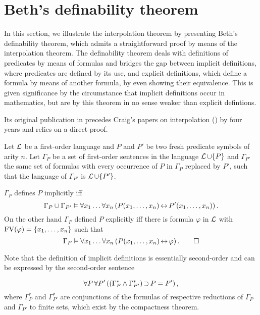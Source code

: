 

\section{Beth's definability theorem}
\label{sec:beth}

In this section, we illustrate the interpolation theorem by presenting Beth's definability theorem, which admits a straightforward proof by means of the interpolation theorem. 
The definability theorem deals with definitions of predicates by means of formulas and bridges the gap between implicit definitions, where predicates are defined by its use, and explicit definitions, which define a formula by means of another formula, by even showing their equivalence.
This is given significance by the circumstance that implicit definitions occur in mathematics, but are by this theorem in no sense weaker than explicit defintions.

Its original publication in \cite{beth1953} precedes Craig's papers on interpolation (\cite{Craig57linear,Craig57three}) by four years and relies on a direct proof.
 

\begin{defi}
	Let $\operatorname{\mathcal{L}}$ be a first-order language and
	$P$ and $P'$ be two fresh predicate symbols of arity $n$.
	Let $\Gamma_P$ be a set of first-order sentences
	in the language $\operatorname{\mathcal{L}}\cup\{P\}$ 
	and $\Gamma_{P'}$ the same set of formulas with every occurrence of $P$ in $\Gamma_P$ replaced by\nolinebreak{} $P'$, such that the language of $\Gamma_{P'}$ is $\operatorname{\mathcal{L}} \cup\{P'\}$.

	$\Gamma_P$ defines $P$ implicitly iff
	\[\Gamma_P \cup \Gamma_{P'} \vDash \forall x_1\dots \forall x_n \left(  P(x_1, \dots, x_n) \operatorname{\leftrightarrow} P'(x_1, \dots, x_n)\right).\]
	On the other hand $\Gamma_P$ defined $P$ explicitly iff there is formula $\varphi$ in $\operatorname{\mathcal{L}}$ with $\operatorname{FV}(\varphi) = \{x_1, \dots, x_n\}$ such that 
	\[\Gamma_P\vDash \forall x_1\dots \forall x_n \left(  P(x_1, \dots, x_n) \operatorname{\leftrightarrow} \varphi\right).\qedhere\]
\end{defi}

Note that the definition of implicit definitions is essentially second-order 
and 
can be expressed by the second-order sentence
\begin{samepage}
\[ \forall P\,\forall P' \left(  \left(\Gamma^*_P \land \Gamma^*_{P'} \right) \operatorname{\supset} P=P'\right),\] 
where $\Gamma^*_P$ and $\Gamma^*_{P'}$ are conjunctions of the formulas of 
respective reductions of $\Gamma_P$ and $\Gamma_{P'}$ 
to finite sets, which exist by the compactness theorem.
\end{samepage}

